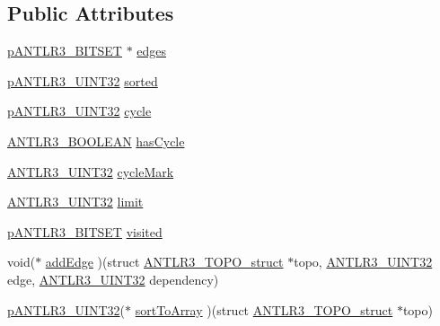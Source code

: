 \subsection*{Public Attributes}
\begin{DoxyCompactItemize}
\item 
\hyperlink{antlr3interfaces_8h_ab15ce244874643afe4a952daf417f744}{p\-A\-N\-T\-L\-R3\-\_\-\-B\-I\-T\-S\-E\-T} $\ast$ \hyperlink{struct_a_n_t_l_r3___t_o_p_o__struct_afa57fd633eb1fc880e1ed3134f9a565e}{edges}
\item 
\hyperlink{antlr3defs_8h_a1967e4354a0a471b539906ece8c84f26}{p\-A\-N\-T\-L\-R3\-\_\-\-U\-I\-N\-T32} \hyperlink{struct_a_n_t_l_r3___t_o_p_o__struct_a951b50a28f80fe4adb1e3feb94a0b240}{sorted}
\item 
\hyperlink{antlr3defs_8h_a1967e4354a0a471b539906ece8c84f26}{p\-A\-N\-T\-L\-R3\-\_\-\-U\-I\-N\-T32} \hyperlink{struct_a_n_t_l_r3___t_o_p_o__struct_a347e5faba5b581d7a40cb8e991a2a4d3}{cycle}
\item 
\hyperlink{antlr3defs_8h_a5b33dccbba3b7212539695e21df4079b}{A\-N\-T\-L\-R3\-\_\-\-B\-O\-O\-L\-E\-A\-N} \hyperlink{struct_a_n_t_l_r3___t_o_p_o__struct_aeb46288b95c9678318d803794c6083bb}{has\-Cycle}
\item 
\hyperlink{antlr3defs_8h_ac41f744abd0fd25144b9eb9d11b1dfd1}{A\-N\-T\-L\-R3\-\_\-\-U\-I\-N\-T32} \hyperlink{struct_a_n_t_l_r3___t_o_p_o__struct_a5ea68d5a04d801efebcbe00f700fae8b}{cycle\-Mark}
\item 
\hyperlink{antlr3defs_8h_ac41f744abd0fd25144b9eb9d11b1dfd1}{A\-N\-T\-L\-R3\-\_\-\-U\-I\-N\-T32} \hyperlink{struct_a_n_t_l_r3___t_o_p_o__struct_a5ae29a928ef2ee25806c73978f2c96b6}{limit}
\item 
\hyperlink{antlr3interfaces_8h_ab15ce244874643afe4a952daf417f744}{p\-A\-N\-T\-L\-R3\-\_\-\-B\-I\-T\-S\-E\-T} \hyperlink{struct_a_n_t_l_r3___t_o_p_o__struct_a067c02a397704d719faaa2611f7fdf8e}{visited}
\item 
void($\ast$ \hyperlink{struct_a_n_t_l_r3___t_o_p_o__struct_afb41f8a34a9fbbb281748fec3bb3a255}{add\-Edge} )(struct \hyperlink{struct_a_n_t_l_r3___t_o_p_o__struct}{A\-N\-T\-L\-R3\-\_\-\-T\-O\-P\-O\-\_\-struct} $\ast$topo, \hyperlink{antlr3defs_8h_ac41f744abd0fd25144b9eb9d11b1dfd1}{A\-N\-T\-L\-R3\-\_\-\-U\-I\-N\-T32} edge, \hyperlink{antlr3defs_8h_ac41f744abd0fd25144b9eb9d11b1dfd1}{A\-N\-T\-L\-R3\-\_\-\-U\-I\-N\-T32} dependency)
\item 
\hyperlink{antlr3defs_8h_a1967e4354a0a471b539906ece8c84f26}{p\-A\-N\-T\-L\-R3\-\_\-\-U\-I\-N\-T32}($\ast$ \hyperlink{struct_a_n_t_l_r3___t_o_p_o__struct_a5778c7c2e8db3291ca33797ec9278507}{sort\-To\-Array} )(struct \hyperlink{struct_a_n_t_l_r3___t_o_p_o__struct}{A\-N\-T\-L\-R3\-\_\-\-T\-O\-P\-O\-\_\-struct} $\ast$topo)

\end{DoxyCompactItemize}
